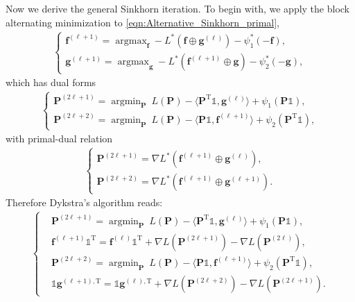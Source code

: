\documentclass[11pt]{book}
\begin{document}
Now we derive the general Sinkhorn iteration. To begin with, we apply the block alternating minimization to \eqref{eqn:Alternative_Sinkhorn_primal},
\begin{align}\label{eqn:Alternative_Dykstra_primal1_primal2}
    \begin{cases}
        \mathbf{f}^{(\ell+1)} = \operatorname{argmax}_{\mathbf{f}} -L^*(\mathbf{f}\oplus\mathbf{g}^{(\ell)}) - \psi_1^*(-\mathbf{f}), \\
        \mathbf{g}^{(\ell+1)} = \operatorname{argmax}_{\mathbf{g}} -L^*(\mathbf{f}^{(\ell+1)}\oplus\mathbf{g}) - \psi_2^*(-\mathbf{g}),
    \end{cases}
\end{align}
which has dual forms
\begin{align}\label{eqn:Alternative_Dykstra_dual1_dual2}
    \begin{cases}
        \mathbf{P}^{(2\ell+1)} = \operatorname{argmin}_{\mathbf{P}} \ L(\mathbf{P}) - \langle \mathbf{P}^{\mathrm{T}}\mathbb{1}, \mathbf{g}^{(\ell)} \rangle + \psi_1(\mathbf{P}\mathbb{1}), \\
        \mathbf{P}^{(2\ell+2)} = \operatorname{argmin}_{\mathbf{P}} \ L(\mathbf{P}) - \langle \mathbf{P}\mathbb{1}, \mathbf{f}^{(\ell+1)} \rangle + \psi_2(\mathbf{P}^{\mathrm{T}}\mathbb{1}),
    \end{cases}
\end{align}
with primal-dual relation
\begin{align}
    \begin{cases}
        \mathbf{P}^{(2\ell+1)} = \nabla L^*(\mathbf{f}^{(\ell+1)}\oplus\mathbf{g}^{(\ell)}),\\
        \mathbf{P}^{(2\ell+2)} = \nabla L^*(\mathbf{f}^{(\ell+1)}\oplus\mathbf{g}^{(\ell+1)}).
    \end{cases}
\end{align}
Therefore Dykstra's algorithm reads:
\begin{align}\label{eqn:Alternative_Dykstra}
    \begin{cases}
        &\mathbf{P}^{(2\ell+1)} = \operatorname{argmin}_{\mathbf{P}} \ L(\mathbf{P}) - \langle \mathbf{P}^{\mathrm{T}}\mathbb{1}, \mathbf{g}^{(\ell)} \rangle + \psi_1(\mathbf{P}\mathbb{1}),\\
        & \mathbf{f}^{(\ell+1)}\mathbb{1}^{\mathrm{T}} = \mathbf{f}^{(\ell)}\mathbb{1}^{\mathrm{T}} + \nabla L(\mathbf{P}^{(2\ell+1)}) - \nabla L(\mathbf{P}^{(2\ell)}),\\
        &\mathbf{P}^{(2\ell+2)} = \operatorname{argmin}_{\mathbf{P}} \ L(\mathbf{P}) - \langle \mathbf{P}\mathbb{1}, \mathbf{f}^{(\ell+1)} \rangle + \psi_2(\mathbf{P}^{\mathrm{T}}\mathbb{1}),\\
        & \mathbb{1}\mathbf{g}^{(\ell+1),\mathrm{T}} = \mathbb{1}\mathbf{g}^{(\ell),\mathrm{T}} + \nabla L(\mathbf{P}^{(2\ell+2)}) - \nabla L(\mathbf{P}^{(2\ell+1)}).
    \end{cases}
\end{align}
\end{document}
